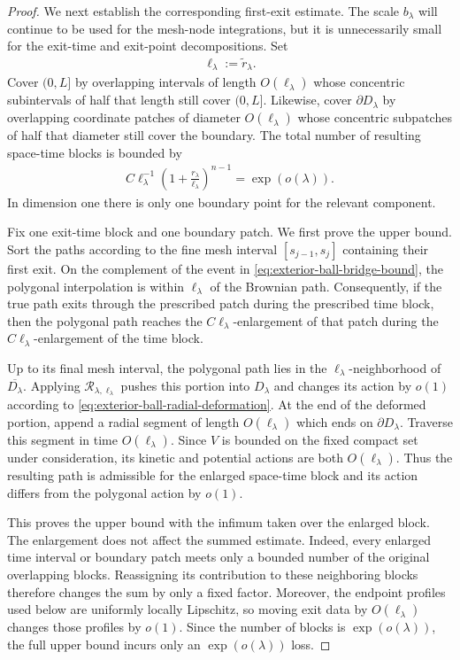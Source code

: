 \documentclass[a4paper,10pt]{article}
\numberwithin{equation}{section}
\theoremstyle{plain}
\theoremstyle{plain}
\theoremstyle{plain}
\theoremstyle{plain}
\theoremstyle{plain}
\theoremstyle{remark}
\theoremstyle{definition}
\newcommand{\eq}[1]{\begin{align*}#1\end{align*}}
\begin{document}
\begin{proof}
We next establish the corresponding first-exit estimate. The scale
$b_\lambda$ will continue to be used for the mesh-node integrations,
but it is unnecessarily small for the exit-time and exit-point
decompositions. Set
\eq{
\ell_\lambda
:=
\widetilde r_\lambda.
}
Cover $(0,L]$ by overlapping intervals of length
$O(\ell_\lambda)$ whose concentric subintervals of half that length
still cover $(0,L]$. Likewise, cover $\partial D_\lambda$ by
overlapping coordinate patches of diameter $O(\ell_\lambda)$ whose
concentric subpatches of half that diameter still cover the boundary.
The total number of resulting space-time blocks is bounded by
\eq{
C
\ell_\lambda^{-1}
\left(
1+
\frac{r_\lambda}{\ell_\lambda}
\right)^{n-1}
=
\exp(o(\lambda)).
}
In dimension one there is only one boundary point for the relevant
component.

Fix one exit-time block and one boundary patch. We first prove the
upper bound. Sort the paths according to the fine mesh interval
$[s_{j-1},s_j]$ containing their first exit. On the complement of
the event in
\cref{eq:exterior-ball-bridge-bound}, the polygonal interpolation is
within $\ell_\lambda$ of the Brownian path. Consequently, if the true
path exits through the prescribed patch during the prescribed time
block, then the polygonal path reaches the
$C\ell_\lambda$-enlargement of that patch during the
$C\ell_\lambda$-enlargement of the time block.

Up to its final mesh interval, the polygonal path lies in the
$\ell_\lambda$-neighborhood of $\overline{D_\lambda}$. Applying
$\mathcal R_{\lambda,\ell_\lambda}$ pushes this portion into
$D_\lambda$ and changes its action by $o(1)$ according to
\cref{eq:exterior-ball-radial-deformation}. At the end of the
deformed portion, append a radial segment of length
$O(\ell_\lambda)$ which ends on $\partial D_\lambda$. Traverse this
segment in time $O(\ell_\lambda)$. Since $V$ is bounded on the fixed
compact set under consideration, its kinetic and potential actions
are both $O(\ell_\lambda)$. Thus the resulting path is admissible for
the enlarged space-time block and its action differs from the
polygonal action by $o(1)$.

This proves the upper bound with the infimum taken over the enlarged
block. The enlargement does not affect the summed estimate. Indeed,
every enlarged time interval or boundary patch meets only a bounded
number of the original overlapping blocks. Reassigning its
contribution to these neighboring blocks therefore changes the sum
by only a fixed factor. Moreover, the endpoint profiles used below
are uniformly locally Lipschitz, so moving exit data by
$O(\ell_\lambda)$ changes those profiles by $o(1)$. Since the number
of blocks is $\exp(o(\lambda))$, the full upper bound incurs only an
$\exp(o(\lambda))$ loss.


\end{proof}
\end{document}
